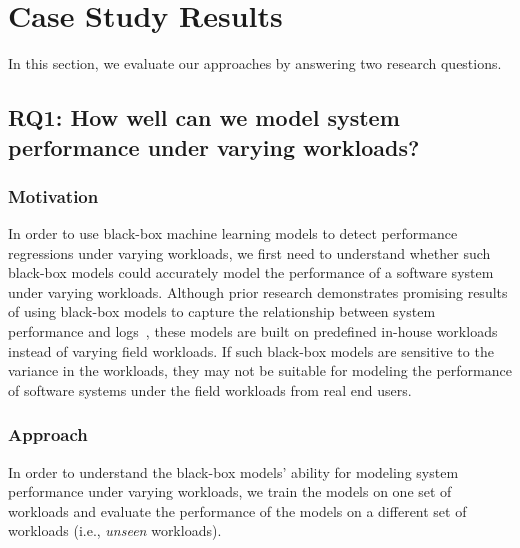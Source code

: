 \section{Case Study Results} \label{sec:casestudyresults}
In this section, we evaluate our approaches by answering two research questions. %

\subsection*{RQ1: How well can we model system performance under varying workloads?}

\subsubsection*{Motivation}
In order to use black-box machine learning models to detect performance regressions under varying workloads, we first need to understand whether such black-box models could accurately model the performance of a software system under varying workloads. %
Although prior research demonstrates promising results of using black-box models to capture the relationship between system performance and logs~\cite{Yao:2018:LSL:3184407.3184416,DBLP:conf/issre/FarshchiSWG15},
these models are built on predefined in-house workloads instead of varying field workloads. 
If such black-box models are sensitive to the variance in the workloads, they may not be suitable for modeling the performance of software systems under the field workloads from real end users.

\subsubsection*{Approach}
In order to understand the black-box models' ability for modeling system performance under varying workloads, we train the models on one set of workloads and evaluate the performance of the models on a different set of workloads (i.e., \emph{unseen} workloads).

